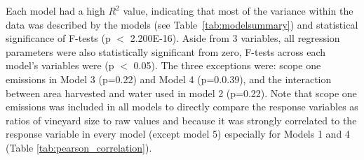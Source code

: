 \documentclass[review,12pt,authoryear]{elsarticle}
\begin{document}
\begin{linenumbers}
Each model had a high $R^2$ value, indicating that most of the variance within the data was described by the models (see Table~\ref{tab:modelsummary}) and statistical significance of F-tests (p $<$ 2.200E-16). Aside from 3 variables, all regression parameters were also statistically significant from zero, F-tests across each model's variables were (p $<$ 0.05). The three exceptions were: scope one emissions in Model 3 (p=0.22) and Model 4 (p=0.0.39), and the interaction between area harvested and water used in model 2 (p=0.22). Note that scope one emissions was included in all models to directly compare the response variables as ratios of vineyard size to raw values and because it was strongly correlated to the response variable in every model (except model 5) especially for Models 1 and 4 (Table \ref{tab:pearson_correlation}). 
\par
\begin{table}[]
  \caption{Summary of models; their performance, F-statistics and Residual error.}\label{tab:modelsummary}
\end{table}
\end{linenumbers}
\end{document}
